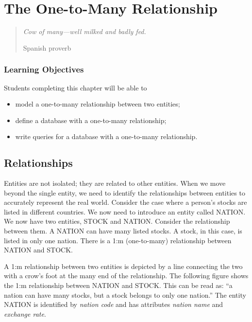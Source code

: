 \documentclass[
]{article}
\begin{document}
\hypertarget{the-one-to-many-relationship}{%
\section{The One-to-Many Relationship}\label{the-one-to-many-relationship}}

\begin{quote}
\emph{Cow of many---well milked and badly fed.}

Spanish proverb
\end{quote}

\hypertarget{learning-objectives-3}{%
\subsubsection*{Learning Objectives}\label{learning-objectives-3}}

Students completing this chapter will be able to

\begin{itemize}
\item
  model a one-to-many relationship between two entities;
\item
  define a database with a one-to-many relationship;
\item
  write queries for a database with a one-to-many relationship.
\end{itemize}

\hypertarget{relationships}{%
\subsection*{Relationships}\label{relationships}}

Entities are not isolated; they are related to other entities. When we
move beyond the single entity, we need to identify the relationships
between entities to accurately represent the real world. Consider the
case where a person's stocks are listed in different countries. We now
need to introduce an entity called NATION. We now have two entities,
STOCK and NATION. Consider the relationship between them. A NATION can
have many listed stocks. A stock, in this case, is listed in only one
nation. There is a 1:m (one-to-many) relationship between NATION and
STOCK.

A 1:m relationship between two entities is depicted by a line connecting
the two with a crow's foot at the many end of the relationship. The
following figure shows the 1:m relationship between NATION and STOCK.
This can be read as: ``a nation can have many stocks, but a stock belongs
to only one nation.'' The entity NATION is identified by \emph{nation code}
and has attributes \emph{nation name} and \emph{exchange rate}.
\end{document}
